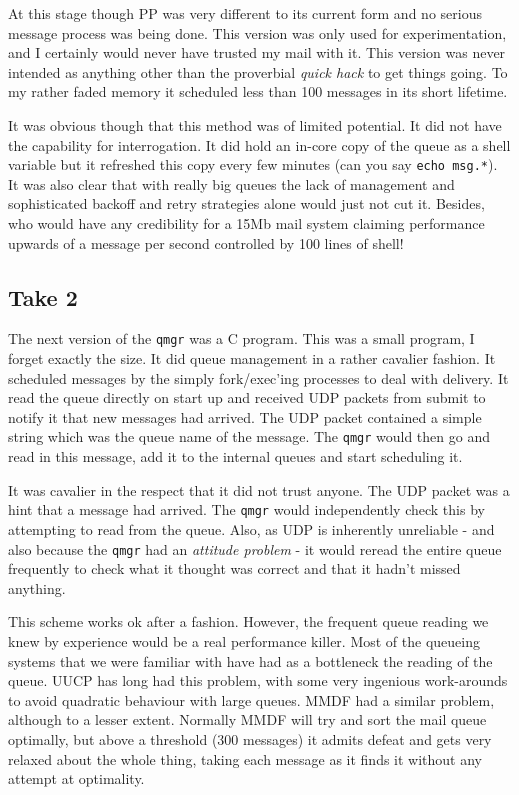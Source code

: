 At this stage though PP was very different to its current form
and no serious message process was being done. This version was only
used for experimentation, and I certainly would never have trusted my
mail with it. This version was never intended as anything other than
the proverbial {\em quick hack} to get things going. To my rather
faded memory it scheduled less than 100 messages in its short
lifetime.

It was obvious though that this method was of limited potential. It
did not have the capability for interrogation. It did hold an in-core
copy of the queue as a shell variable but it refreshed this copy every
few minutes (can you say \verb|echo msg.*|). It was also clear that
with really big queues the lack of management and sophisticated
backoff and retry strategies alone would just not cut it.
Besides, who would have any credibility for a 15Mb mail system
claiming performance upwards of a message per second controlled by 100
lines of shell!

\subsection{Take 2}
The next version of the \verb|qmgr| was a C program. This was a small
program, I forget exactly the size. It did queue management in a
rather cavalier fashion. It scheduled messages by the simply
fork/exec'ing  processes to deal with delivery. It read the queue
directly on start up and received UDP packets from submit to notify it
that new messages had arrived. The UDP packet contained a simple
string which was the queue name of the message. The \verb|qmgr| would then go
and read in this message, add it to the internal queues and start
scheduling it. 

It was cavalier in the respect that it did not trust anyone. The UDP
packet was a hint that a message had arrived. The \verb|qmgr| would
independently check this by attempting to read from the queue.  Also,
as UDP is inherently unreliable - and also because the \verb|qmgr| had an
{\em attitude problem} - it would reread the entire queue frequently
to check what it thought was correct and that it hadn't missed
anything.

This scheme works ok after a fashion. However, the frequent queue
reading we knew by experience would be a real performance killer. Most
of the queueing systems that we were familiar with have had as a
bottleneck the reading of the queue. UUCP has long had this problem,
with some very ingenious work-arounds to avoid quadratic behaviour with
large queues. MMDF had a similar problem, although to a lesser extent.
Normally MMDF will try and sort the mail queue optimally, but above a
threshold (300 messages) it admits defeat and gets very relaxed about
the whole thing, taking each message as it finds it without any
attempt at optimality.

